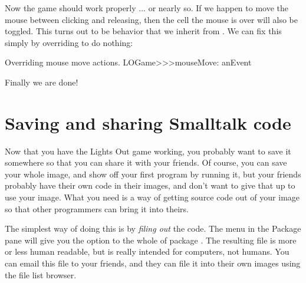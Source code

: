 \documentclass[a4paper,10pt,twoside]{book}
\begin{document}


Now the game should work properly ... or nearly so.  If we happen to move the mouse between clicking and releasing, then the cell the mouse is over will also be toggled.  This turns out to be behavior that we inherit from . We can fix this simply by overriding  to do nothing:

\begin{method}[mouseMove:]{Overriding mouse move actions.}
LOGame>>>mouseMove: anEvent
\end{method}

Finally we are done!


\section{Saving and sharing Smalltalk code}

Now that you have the Lights Out game working, you probably want to save it somewhere so that you can share it with your friends. Of course, you can save your whole \pharo image, and show off your first program by running it, but your friends probably have their own code in their images, and don't want to give that up to use your image.
What you need is a way of getting source code out of your \pharo image so that other programmers can bring it into theirs.

The simplest way of doing this is by \emph{filing out} the code.  The \actclick menu in the Package pane will give you the option to  the whole of package .
The resulting file is more or less human readable, but is really intended for computers, not humans.
You can email this file to your friends, and they can file it into their own \pharo images using the file list browser.
\end{document}
